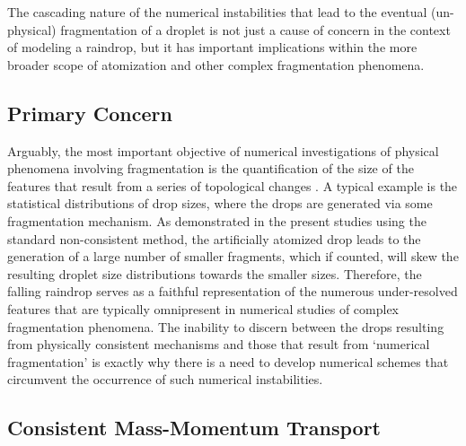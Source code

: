 The cascading nature of the numerical instabilities that lead to 
the eventual (un-physical) fragmentation of a droplet is not just a 
cause of concern in the context of modeling a raindrop, but it has important
implications within the more broader scope of 
atomization and other complex fragmentation phenomena. 


\subsection*{Primary Concern}
Arguably, the most important objective of numerical investigations of physical
phenomena involving fragmentation is the quantification of the size of 
the features that result from a series of topological changes 
. 
A typical example is the statistical distributions of drop sizes, 
where the drops are generated via some fragmentation mechanism. 
As demonstrated in the present studies using the standard non-consistent method,  
the artificially atomized drop leads to the generation of a large number of 
smaller fragments, which if counted, will skew the resulting droplet size 
distributions towards the smaller sizes.
Therefore, the falling raindrop serves as a faithful representation of the 
numerous under-resolved features that are typically omnipresent in
numerical studies of complex fragmentation phenomena.  
The inability to discern between the drops resulting from physically consistent 
mechanisms and those that result from `numerical fragmentation' is exactly
why there is a need to develop numerical schemes that circumvent the occurrence
of such numerical instabilities.  



\subsection*{Consistent Mass-Momentum Transport}


